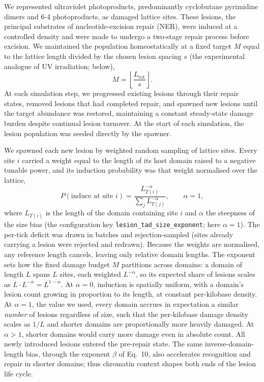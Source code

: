 \documentclass[11pt]{article}
\begin{document}
We represented ultraviolet photoproducts, predominantly cyclobutane pyrimidine
dimers and 6-4 photoproducts, as damaged lattice sites. These lesions, the principal
substrates of nucleotide-excision repair (NER), were induced at a controlled density
and were made to undergo a two-stage repair process before excision. We maintained
the population homeostatically at a fixed target $M$ equal to the lattice length
divided by the chosen lesion spacing $s$ (the experimental analogue of UV irradiation; below),
%
\begin{equation}
M = \left\lfloor \frac{L_{\mathrm{tot}}}{s} \right\rfloor.
\end{equation}
%
At each simulation step, we progressed existing lesions through their repair states,
removed lesions that had completed repair, and spawned new lesions until the target
abundance was restored, maintaining a constant steady-state damage burden despite
continual lesion turnover. At the start of each simulation, the lesion population was
seeded directly by the spawner.

We spawned each new lesion by weighted random sampling of lattice sites. Every site
$i$ carried a weight equal to the length of its host domain raised to a negative
tunable power, and its induction probability was that weight normalised over the
lattice,
%
\begin{equation}
P(\text{induce at site } i) = \frac{L_{T(i)}^{-\alpha}}{\sum_{j} L_{T(j)}^{-\alpha}},
\qquad \alpha = 1,
\end{equation}
%
where $L_{T(i)}$ is the length of the domain containing site $i$ and $\alpha$ the
steepness of the size bias (the configuration key \texttt{lesion\_tad\_size\_exponent};
here $\alpha=1$). The per-tick deficit was drawn in batches and rejection-sampled
(sites already carrying a lesion were rejected and redrawn). Because the weights
are normalised, any reference length cancels, leaving only relative domain lengths.
The exponent sets how the fixed damage budget $M$ partitions across domains: a domain
of length $L$ spans $L$ sites, each weighted $L^{-\alpha}$, so its expected share of
lesions scales as $L\cdot L^{-\alpha}=L^{1-\alpha}$. At $\alpha=0$, induction is
spatially uniform, with a domain's lesion count growing in proportion to its length,
at constant per-kilobase density. At $\alpha=1$, the value we used, every domain
accrues in expectation a similar \emph{number} of lesions regardless of size, such
that the per-kilobase damage density scales as $1/L$ and shorter domains are
proportionally more heavily damaged. At $\alpha>1$, shorter domains would carry more
damage even in absolute count. All newly introduced lesions entered the pre-repair
state. The same inverse-domain-length bias, through the exponent $\beta$ of Eq.~10,
also accelerates recognition and repair in shorter domains; thus chromatin context
shapes both ends of the lesion life cycle.
\end{document}
